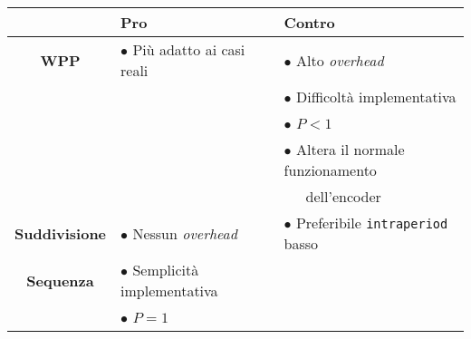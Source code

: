 \begin{table}[H]
  \centering
  \begin{tabular}{|c|l|l|}
    \hline
    
    & 
    \textbf{Pro} & 
    \textbf{Contro} \\
    
    \hline
    \hline
    \hline
    
    \textbf{WPP} &
    $\bullet$ Più adatto ai casi reali &
    $\bullet$ Alto \emph{overhead} \\
    
    &
    &
    $\bullet$ Difficoltà implementativa \\
    
    &
    &
    $\bullet$ $P < 1$ \\
    &
    &
    $\bullet$ Altera il normale funzionamento \\
    &
    &
    \ \ \ dell'encoder \\ 
    
    \hline
    
    \textbf{Suddivisione} &
     
    $\bullet$ Nessun \emph{overhead} &
    $\bullet$ Preferibile \verb|intraperiod| basso \\
    \textbf{Sequenza} 
    &
    $\bullet$ Semplicità implementativa &
    \\
    
    &
    $\bullet$ $P = 1$ &
    \\
    
    \hline
  \end{tabular}
\end{table}

